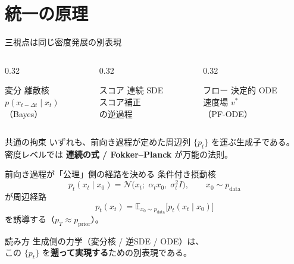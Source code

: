 \section{統一の原理}
\asmain
\begin{frame}{三視点は同じ密度発展の別表現}
    \begin{columns}[T,onlytextwidth]
        \begin{column}{0.32\textwidth}
            \begin{block}{変分}
                離散核\\
                $p(x_{t-\Delta t}\mid x_t)$\\
                （Bayes）
            \end{block}
        \end{column}
        \begin{column}{0.32\textwidth}
            \begin{block}{スコア}
                連続 SDE\\
                スコア補正\\
                の逆過程
            \end{block}
        \end{column}
        \begin{column}{0.32\textwidth}
            \begin{block}{フロー}
                決定的 ODE\\
                速度場 $v^{*}$\\
                （PF-ODE）
            \end{block}
        \end{column}
    \end{columns}
    \vfill
    \begin{alertblock}{共通の拘束}
        いずれも、前向き過程が定めた周辺列 $\{p_t\}$ を運ぶ生成子である。\\
        密度レベルでは \textbf{連続の式 / Fokker--Planck} が万能の法則。
    \end{alertblock}
\end{frame}
\asmain
\begin{frame}{前向き過程が「公理」側の経路を決める}
    条件付き摂動核
    \[
        p_t(x_t\mid x_0)
        =
        \mathcal{N}\!\bigl(x_t;\;\alpha_t x_0,\;\sigma_t^{2}I\bigr),
        \qquad
        x_0\sim p_{\mathrm{data}}
    \]
    が周辺経路
    \[
        p_t(x_t)
        =
        \mathbb{E}_{x_0\sim p_{\mathrm{data}}}
        \bigl[p_t(x_t\mid x_0)\bigr]
    \]
    を誘導する（$p_T\approx p_{\mathrm{prior}}$）。
    \begin{exampleblock}{読み方}
        生成側の力学（変分核 / 逆SDE / ODE）は、\\
        この $\{p_t\}$ を\textbf{遡って実現する}ための別表現である。
    \end{exampleblock}
\end{frame}
